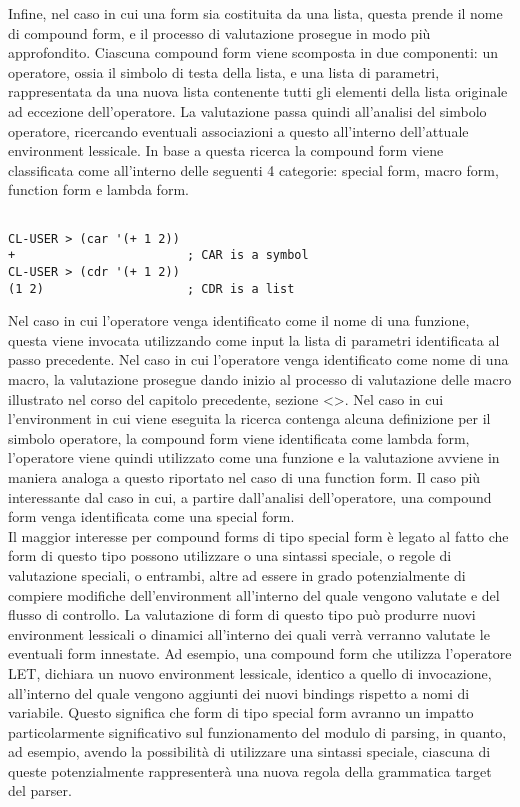 Infine, nel caso in cui una form sia costituita da una lista, questa prende il
nome di compound form, e il processo di valutazione prosegue in modo più
approfondito. Ciascuna compound form viene scomposta in due componenti: un
operatore, ossia il simbolo di testa della lista, e una lista di parametri,
rappresentata da una nuova lista contenente tutti gli elementi della lista
originale ad eccezione dell’operatore. La valutazione passa quindi all’analisi
del simbolo operatore, ricercando eventuali associazioni a questo all’interno
dell’attuale environment lessicale. In base a questa ricerca la compound form
viene classificata come all’interno delle seguenti 4 categorie: special form,
macro form, function form e lambda form.

\begin{lstlisting}

CL-USER > (car '(+ 1 2))
+                        ; CAR is a symbol
CL-USER > (cdr '(+ 1 2))
(1 2)                    ; CDR is a list

\end{lstlisting}

Nel caso in cui l’operatore venga identificato come il nome di una funzione,
questa viene invocata utilizzando come input la lista di parametri
identificata al passo precedente. Nel caso in cui l’operatore venga
identificato come nome di una macro, la valutazione prosegue dando inizio al
processo di valutazione delle macro illustrato nel corso del capitolo
precedente, sezione <>. Nel caso in cui l’environment in cui viene eseguita la
ricerca contenga alcuna definizione per il simbolo operatore, la compound form
viene identificata come lambda form, l’operatore viene quindi utilizzato come
una funzione e la valutazione avviene in maniera analoga a questo riportato
nel caso di una function form. Il caso più interessante dal caso in cui, a
partire dall’analisi dell’operatore, una compound form venga identificata come
una special form.\\

Il maggior interesse per compound forms di tipo special form è legato al fatto
che form di questo tipo possono utilizzare o una sintassi speciale, o regole
di valutazione speciali, o entrambi, altre ad essere in grado potenzialmente
di compiere modifiche dell’environment all’interno del quale vengono valutate
e del flusso di controllo. La valutazione di form di questo tipo può produrre
nuovi environment lessicali o dinamici all’interno dei quali verrà verranno
valutate le eventuali form innestate. Ad esempio, una compound form che
utilizza l’operatore LET, dichiara un nuovo environment lessicale, identico a
quello di invocazione, all’interno del quale vengono aggiunti dei nuovi
bindings rispetto a nomi di variabile. Questo significa che form di tipo
special form avranno un impatto particolarmente significativo sul
funzionamento del modulo di parsing, in quanto, ad esempio, avendo la
possibilità di utilizzare una sintassi speciale, ciascuna di queste
potenzialmente rappresenterà una nuova regola della grammatica target del
parser.\\


